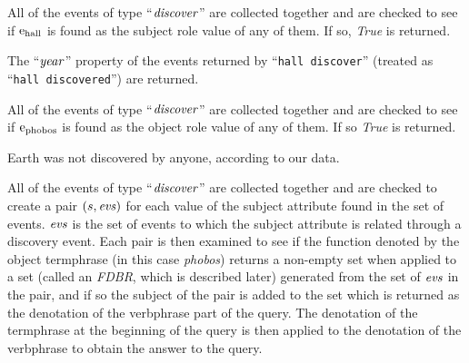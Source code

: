 \documentclass[../main.tex]{subfiles}
\begin{document}
\begin{refsection}
\examplespacing

\noindent All of the events of type ``$\operatorname{\mathit{discover}}$'' are collected together and are checked to see if $\mathrm{e}_{\operatorname{hall}}$ is found as the subject role value of any of them. If so, \textit{True} is returned.

\examplespacing


\examplespacing

\noindent The ``$\operatorname{\mathit{year}}$'' property of the  events returned by ``\texttt{hall discover}'' (treated as ``\texttt{hall discovered}'') are returned.

\examplespacing


\examplespacing

\noindent All of the events of type ``$\operatorname{\mathit{discover}}$'' are collected together and are checked to see if $\mathrm{e}_{\operatorname{phobos}}$ is found as the object role value of any of them. If so \textit{True} is returned.

\examplespacing


\examplespacing

\noindent Earth was not discovered by anyone, according to our data.

\examplespacing


\examplespacing


\noindent All of the events of type ``$\operatorname{\mathit{discover}}$'' are collected together and are checked to create a pair $(s, \operatorname{\mathit{evs}})$ for each value of the subject attribute found in the set of events. $\operatorname{\mathit{evs}}$ is the set of events to which the subject attribute is related through a discovery event.  Each pair is then examined to see if the function denoted by the object termphrase (in this case \textit{phobos}) returns a non-empty set when applied to a set (called an \textit{FDBR}, which is described later) generated from the set of $\operatorname{\mathit{evs}}$ in the pair, and if so the subject of the pair is added to the set which is returned as the denotation of the verbphrase part of the query. The denotation of the termphrase at the beginning of the query is then applied to the denotation of the verbphrase to obtain the answer to the query. %


\end{refsection}
\end{document}
